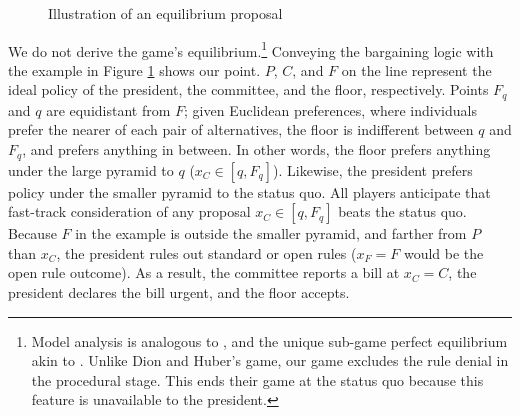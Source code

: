 \documentclass[letter,12pt]{article}
\begin{document}
\begin{figure}
  \centering
  \caption{Illustration of an equilibrium proposal}\label{F:example}
\end{figure}

We do not derive the game's equilibrium.\footnote{Model analysis is analogous to \citet{dion.huber.1996}, and the unique sub-game perfect equilibrium akin to \citet{magar.nd,romer.rosenthal.1978,cox.mccubbins.2005,gerber.1996}. Unlike Dion and Huber's game, our game excludes the rule denial in the procedural stage. This ends their game at the status quo because this feature is unavailable to the president.} Conveying the bargaining logic with the example in Figure \ref{F:example} shows our point. $P$, $C$, and $F$ on the line represent the ideal policy of the president, the committee, and the floor, respectively. Points $F_q$ and $q$ are equidistant from $F$; given Euclidean preferences, where individuals prefer the nearer of each pair of alternatives, the floor is indifferent between $q$ and $F_q$, and prefers anything in between. In other words, the floor prefers anything under the large pyramid to $q$ ($x_C \in [q,F_q]$). Likewise, the president prefers policy under the smaller pyramid to the status quo. All players anticipate that fast-track consideration of any proposal $x_C \in [q,F_q]$ beats the status quo. Because $F$ in the example is outside the smaller pyramid, and farther from $P$ than $x_C$, the president rules out standard or open rules ($x_F=F$ would be the open rule outcome). As a result, the committee reports a bill at $x_C=C$, the president declares the bill urgent, and the floor accepts. 
\end{document}
